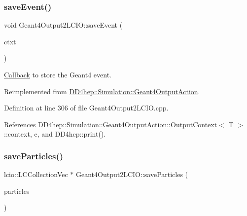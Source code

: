 \hypertarget{class_d_d4hep_1_1_simulation_1_1_geant4_output2_l_c_i_o_a86749213718dcb1ed4783ab86a374d92}{}\label{class_d_d4hep_1_1_simulation_1_1_geant4_output2_l_c_i_o_a86749213718dcb1ed4783ab86a374d92} 
\subsubsection{\texorpdfstring{save\+Event()}{saveEvent()}}
{\footnotesize\ttfamily void Geant4\+Output2\+L\+C\+I\+O\+::save\+Event (\begin{DoxyParamCaption}\item[{\hyperlink{class_d_d4hep_1_1_simulation_1_1_geant4_output_action_1_1_output_context}{Output\+Context}$<$ G4\+Event $>$ \&}]{ctxt }\end{DoxyParamCaption})\hspace{0.3cm}{\ttfamily [virtual]}}



\hyperlink{class_d_d4hep_1_1_callback}{Callback} to store the Geant4 event. 



Reimplemented from \hyperlink{class_d_d4hep_1_1_simulation_1_1_geant4_output_action_a660080e931d757573839927ca99bfbed}{D\+D4hep\+::\+Simulation\+::\+Geant4\+Output\+Action}.



Definition at line 306 of file Geant4\+Output2\+L\+C\+I\+O.\+cpp.



References D\+D4hep\+::\+Simulation\+::\+Geant4\+Output\+Action\+::\+Output\+Context$<$ T $>$\+::context, e, and D\+D4hep\+::print().

\hypertarget{class_d_d4hep_1_1_simulation_1_1_geant4_output2_l_c_i_o_a8c72e4dba5f1d6d5e38ea206e988d418}{}\label{class_d_d4hep_1_1_simulation_1_1_geant4_output2_l_c_i_o_a8c72e4dba5f1d6d5e38ea206e988d418} 
\subsubsection{\texorpdfstring{save\+Particles()}{saveParticles()}}
{\footnotesize\ttfamily lcio\+::\+L\+C\+Collection\+Vec $\ast$ Geant4\+Output2\+L\+C\+I\+O\+::save\+Particles (\begin{DoxyParamCaption}\item[{\hyperlink{class_d_d4hep_1_1_simulation_1_1_geant4_particle_map}{Geant4\+Particle\+Map} $\ast$}]{particles }\end{DoxyParamCaption})\hspace{0.3cm}{\ttfamily [protected]}}



